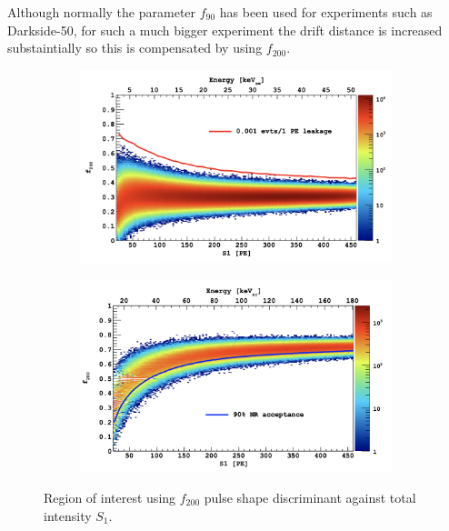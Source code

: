 \documentclass[11pt]{article} %
\begin{document}
Although normally the parameter $f_{90}$ has been used for experiments such as Darkside-50, for such a much bigger experiment the drift distance is increased substaintially so this
is compensated by using $f_{200}$.
\begin{figure}[H]
\begin{minipage}{.49\textwidth}
  \centering
  \begin{subfigure}{\textwidth}
      \includegraphics[width=\textwidth]{./images/psd_background.png}
  \end{subfigure}
\end{minipage}
\begin{minipage}{.49\textwidth}
  \centering
  \begin{subfigure}{\textwidth}
      \includegraphics[width=\textwidth]{./images/psd_signal.png}
  \end{subfigure}
\end{minipage}
\caption{\cite{aalseth2018darkside} Region of interest using $f_{200}$ pulse shape discriminant against total intensity $S_1$.}
\label{fig:psd}
\end{figure}
\end{document}
